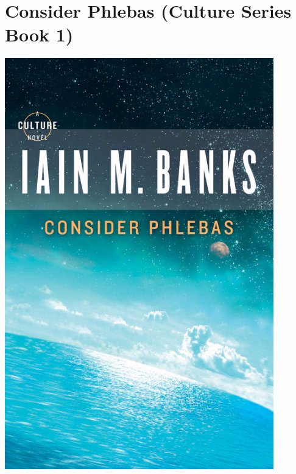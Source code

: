 \documentclass{tufte-handout}
\makeatletter
\newcommand{\varcaption}[2][0pt]{%
  \gsetlength{\@tufte@caption@vertical@offset}{-#1}%
  \gdef\@tufte@stored@varcaption{#2}%
}
\gdef\@tufte@stored@varcaption{} %
\makeatother
\begin{document}
\section*{Consider Phlebas (Culture Series Book 1)}
\begin{marginfigure}[8\baselineskip]
   \includegraphics[width=\linewidth]{images/consider_phlebas.jpg}
   \varcaption{\href{https://www.hachettebookgroup.com/titles/iain-m-banks/consider-phlebas/9780316095839/}{Publisher Link}, \href{https://www.amazon.com/Consider-Phlebas-Culture-Iain-Banks/dp/031600538X/}{Amazon Link}}
\end{marginfigure}
\end{document}
